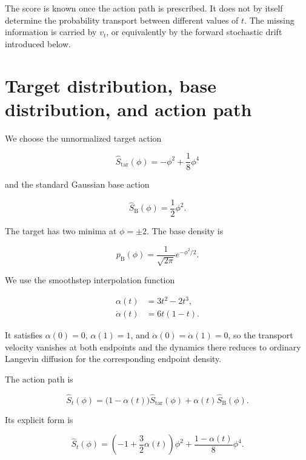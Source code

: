 \documentclass[reprint,twocolumn,superscriptaddress,preprintnumbers,amsmath,amssymb,aps,prd,floatfix]{revtex4-2}
\begin{document}
The score is known once the action path is prescribed. It does not by itself determine the probability transport between different values of $t$. The missing information is carried by $v_t$, or equivalently by the forward stochastic drift introduced below.

\section{Target distribution, base distribution, and action path}

We choose the unnormalized target action

\begin{equation}
 \hat S_{\mathrm{tar}}(\phi)
 =
 -\phi^2+\frac{1}{8}\phi^4
 \label{eq:target_action}
\end{equation}

and the standard Gaussian base action

\begin{equation}
 \hat S_{\mathrm{B}}(\phi)
 =
 \frac{1}{2}\phi^2.
 \label{eq:base_action}
\end{equation}

The target has two minima at $\phi=\pm2$. The base density is

\begin{equation}
 p_{\mathrm{B}}(\phi)
 =
 \frac{1}{\sqrt{2\pi}}e^{-\phi^2/2}.
\end{equation}

We use the smoothstep interpolation function

\begin{align}
 \alpha(t)
 &=
 3t^2-2t^3,
 \\
 \dot\alpha(t)
 &=
 6t(1-t).
 \label{eq:schedule}
\end{align}

It satisfies $\alpha(0)=0$, $\alpha(1)=1$, and $\dot\alpha(0)=\dot\alpha(1)=0$, so the
transport velocity vanishes at both endpoints and the dynamics there reduces to
ordinary Langevin diffusion for the corresponding endpoint density.

The action path is

\begin{equation}
 \hat S_t(\phi)
 =
 \bigl(1-\alpha(t)\bigr)\hat S_{\mathrm{tar}}(\phi)
 +
 \alpha(t)\hat S_{\mathrm{B}}(\phi).
 \label{eq:action_path}
\end{equation}

Its explicit form is

\begin{equation}
 \hat S_t(\phi)
 =
 \left(-1+\frac{3}{2}\alpha(t)\right)\phi^2
 +
 \frac{1-\alpha(t)}{8}\phi^4.
 \label{eq:action_explicit}
\end{equation}
\end{document}
